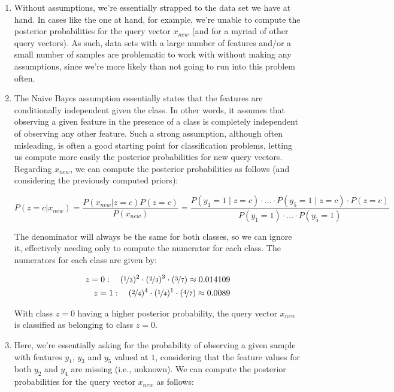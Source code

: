 \documentclass[12pt]{article}
\begin{document}
\begin{enumerate}[leftmargin=\labelsep]
\begin{enumerate}
{                }
          \item {
                Without assumptions, we're essentially strapped to the data set we have at hand.
                In cases like the one at hand, for example, we're unable to compute the posterior
                probabilities for the query vector $x_{new}$ (and for a myriad of other query vectors).
                As such, data sets with a large number of features and/or a small number of samples
                are problematic to work with without making any assumptions, since we're
                more likely than not going to run into this problem often.
                }
          \item {
                The Naive Bayes assumption essentially states that the features are conditionally
                independent given the class. In other words, it assumes that observing a given
                feature in the presence of a class is completely independent of observing any other feature.
                Such a strong assumption, although often misleading, is often a good starting point for
                classification problems, letting us compute more easily the posterior probabilities
                for new query vectors. Regarding $x_{new}$, we can compute the posterior probabilities
                as follows (and considering the previously computed priors):

                $$
                  P(z = c | x_{new}) = \frac{P(x_{new} | z = c) P(z = c)}{P(x_{new})}
                  = \frac{P(y_1 = 1 \mid z = c) \cdot ... \cdot P(y_5 = 1 \mid z = c) \cdot P(z = c)}{P(y_1 = 1) \cdot ... \cdot P(y_5 = 1)}
                $$

                The denominator will always be the same for both classes, so we can ignore it,
                effectively needing only to compute the numerator for each class. The numerators
                for each class are given by:

                \begin{align*}
                  z = 0: \quad (\nicefrac{1}{3})^2 \cdot (\nicefrac{2}{3})^3 \cdot (\nicefrac{3}{7}) \approx 0.014109 \\
                  z = 1: \quad (\nicefrac{2}{4})^4 \cdot (\nicefrac{1}{4})^1 \cdot (\nicefrac{4}{7}) \approx 0.0089
                \end{align*}

                With class $z=0$ having a higher posterior probability, the query vector $x_{new}$
                is classified as belonging to class $z=0$.
                }
          \item {
                Here, we're essentially asking for the probability of observing a given sample
                with features $y_1$, $y_3$ and $y_5$ valued at $1$, considering that the
                feature values for both $y_2$ and $y_4$ are missing (i.e., unknown). We can
                compute the posterior probabilities for the query vector $x_{new}$ as follows:

}
\end{enumerate}
\end{enumerate}
\end{document}
